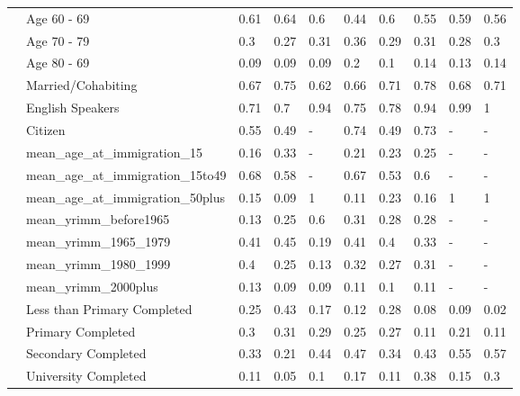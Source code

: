 \begin{table}[ht]
\begin{tabular}{l|l|llllllll}
   & Age 60 - 69 & 0.61 & 0.64 & 0.6 & 0.44 & 0.6 & 0.55 & 0.59 & 0.56 \\ 
   & Age 70 - 79 & 0.3 & 0.27 & 0.31 & 0.36 & 0.29 & 0.31 & 0.28 & 0.3 \\ 
   & Age 80 - 69 & 0.09 & 0.09 & 0.09 & 0.2 & 0.1 & 0.14 & 0.13 & 0.14 \\ 
   & Married/Cohabiting & 0.67 & 0.75 & 0.62 & 0.66 & 0.71 & 0.78 & 0.68 & 0.71 \\ 
   & English Speakers & 0.71 & 0.7 & 0.94 & 0.75 & 0.78 & 0.94 & 0.99 & 1 \\ 
   & Citizen & 0.55 & 0.49 & - & 0.74 & 0.49 & 0.73 & - & - \\ 
   & mean\_age\_at\_immigration\_15 & 0.16 & 0.33 & - & 0.21 & 0.23 & 0.25 & - & - \\ 
   & mean\_age\_at\_immigration\_15to49 & 0.68 & 0.58 & - & 0.67 & 0.53 & 0.6 & - & - \\ 
   & mean\_age\_at\_immigration\_50plus & 0.15 & 0.09 & 1 & 0.11 & 0.23 & 0.16 & 1 & 1 \\ 
   & mean\_yrimm\_before1965 & 0.13 & 0.25 & 0.6 & 0.31 & 0.28 & 0.28 & - & - \\ 
   & mean\_yrimm\_1965\_1979 & 0.41 & 0.45 & 0.19 & 0.41 & 0.4 & 0.33 & - & - \\ 
   & mean\_yrimm\_1980\_1999 & 0.4 & 0.25 & 0.13 & 0.32 & 0.27 & 0.31 & - & - \\ 
   & mean\_yrimm\_2000plus & 0.13 & 0.09 & 0.09 & 0.11 & 0.1 & 0.11 & - & - \\ 
   & Less than Primary Completed & 0.25 & 0.43 & 0.17 & 0.12 & 0.28 & 0.08 & 0.09 & 0.02 \\ 
   & Primary Completed & 0.3 & 0.31 & 0.29 & 0.25 & 0.27 & 0.11 & 0.21 & 0.11 \\ 
   & Secondary Completed & 0.33 & 0.21 & 0.44 & 0.47 & 0.34 & 0.43 & 0.55 & 0.57 \\ 
   & University Completed & 0.11 & 0.05 & 0.1 & 0.17 & 0.11 & 0.38 & 0.15 & 0.3 \\ 
   \hline
\end{tabular}
\endgroup
\end{table}
